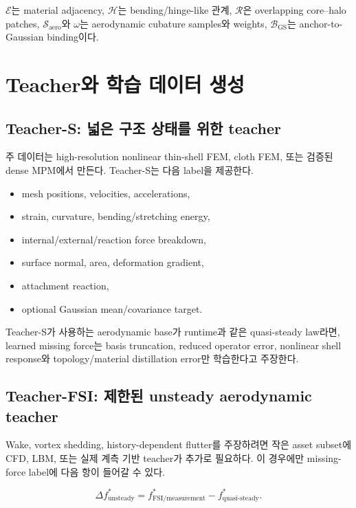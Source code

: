 \documentclass[11pt,a4paper]{article}
\begin{document}
\(\mathcal E\)는 material adjacency,
\(\mathcal H\)는 bending/hinge-like 관계,
\(\mathcal R\)은 overlapping core--halo patches,
\(\mathcal S_{\mathrm{aero}}\)와 \(\omega\)는 aerodynamic cubature samples와 weights,
\(\mathcal B_{\mathrm{GS}}\)는 anchor-to-Gaussian binding이다.

\section{Teacher와 학습 데이터 생성}

\subsection{Teacher-S: 넓은 구조 상태를 위한 teacher}

주 데이터는 high-resolution nonlinear thin-shell FEM, cloth FEM,
또는 검증된 dense MPM에서 만든다.
Teacher-S는 다음 label을 제공한다.

\begin{itemize}[leftmargin=1.5em]
  \item mesh positions, velocities, accelerations,
  \item strain, curvature, bending/stretching energy,
  \item internal/external/reaction force breakdown,
  \item surface normal, area, deformation gradient,
  \item attachment reaction,
  \item optional Gaussian mean/covariance target.
\end{itemize}

Teacher-S가 사용하는 aerodynamic base가 runtime과 같은 quasi-steady law라면,
learned missing force는 basis truncation, reduced operator error,
nonlinear shell response와 topology/material distillation error만 학습한다고 주장한다.

\subsection{Teacher-FSI: 제한된 unsteady aerodynamic teacher}

Wake, vortex shedding, history-dependent flutter를 주장하려면
작은 asset subset에 CFD, LBM, 또는 실제 계측 기반 teacher가 추가로 필요하다.
이 경우에만 missing-force label에 다음 항이 들어갈 수 있다.

\begin{equation}
  \Delta f_{\mathrm{unsteady}}^*
  =
  f_{\mathrm{FSI/measurement}}^*
  -
  f_{\mathrm{quasi\mbox{-}steady}}^*.
\end{equation}
\end{document}
